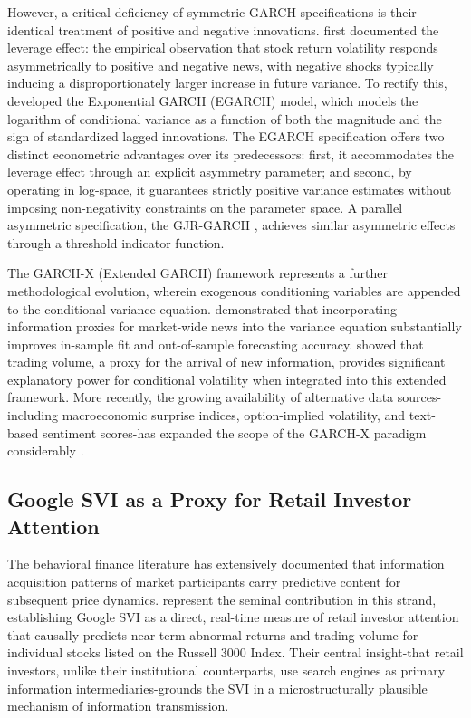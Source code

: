 \documentclass[12pt, a4paper]{article}
\begin{document}
However, a critical deficiency of symmetric GARCH specifications is their identical treatment of positive and negative innovations. \citet{black1976} first documented the leverage effect: the empirical observation that stock return volatility responds asymmetrically to positive and negative news, with negative shocks typically inducing a disproportionately larger increase in future variance. To rectify this, \citet{nelson1991} developed the Exponential GARCH (EGARCH) model, which models the logarithm of conditional variance as a function of both the magnitude and the sign of standardized lagged innovations. The EGARCH specification offers two distinct econometric advantages over its predecessors: first, it accommodates the leverage effect through an explicit asymmetry parameter; and second, by operating in log-space, it guarantees strictly positive variance estimates without imposing non-negativity constraints on the parameter space. A parallel asymmetric specification, the GJR-GARCH \citep{glosten1993}, achieves similar asymmetric effects through a threshold indicator function.

The GARCH-X (Extended GARCH) framework represents a further methodological evolution, wherein exogenous conditioning variables are appended to the conditional variance equation. \citet{engle_ng1993} demonstrated that incorporating information proxies for market-wide news into the variance equation substantially improves in-sample fit and out-of-sample forecasting accuracy. \citet{andersen1996} showed that trading volume, a proxy for the arrival of new information, provides significant explanatory power for conditional volatility when integrated into this extended framework. More recently, the growing availability of alternative data sources-including macroeconomic surprise indices, option-implied volatility, and text-based sentiment scores-has expanded the scope of the GARCH-X paradigm considerably \citep{hamid2015}.

\subsection{Google SVI as a Proxy for Retail Investor Attention}

The behavioral finance literature has extensively documented that information acquisition patterns of market participants carry predictive content for subsequent price dynamics. \citet{da2011} represent the seminal contribution in this strand, establishing Google SVI as a direct, real-time measure of retail investor attention that causally predicts near-term abnormal returns and trading volume for individual stocks listed on the Russell 3000 Index. Their central insight-that retail investors, unlike their institutional counterparts, use search engines as primary information intermediaries-grounds the SVI in a microstructurally plausible mechanism of information transmission.
\end{document}
